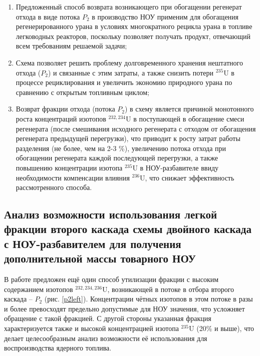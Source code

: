 \begin{enumerate}
    \item Предложенный способ возврата возникающего при обогащении регенерат отхода в виде потока $P_2$ в производство НОУ применим для обогащения регенерированного урана в условиях многократного рецикла урана в топливе легководных реакторов, поскольку позволяет получать продукт, отвечающий всем требованиям решаемой задачи;
    \item Схема позволяет решить проблему долговременного хранения нештатного отхода ($P_2$) и связанные с этим затраты, а также снизить потери $^{235}$U в процессе рециклирования и увеличить экономию природного урана по сравнению с открытым топливным циклом;
     \item Возврат фракции отхода (потока $P_2$) в схему является причиной монотонного роста концентраций изотопов $^{232,234}$U в поступающей в обогащение смеси регенерата (после смешивания исходного регенерата с отходом от обогащения регенерата предыдущей перегрузки), что приводит к росту затрат работы разделения (не более, чем на 2-3 \%), увеличению потока отхода при обогащении регенерата каждой последующей перегрузки, а также повышению концентрации изотопа $^{235}$U в НОУ-разбавителе ввиду необходимости компенсации влияния $^{236}$U, что снижает эффективность рассмотренного способа.
\end{enumerate}


\subsection{Анализ возможности использования легкой фракции второго каскада схемы двойного каскада с НОУ-разбавителем для получения дополнительной массы товарного НОУ}\label{indep_p2}

В работе предложен ещё один способ утилизации фракции с высоким содержанием изотопов $^{232,234,236}$U, возникающей в потоке в отбора второго каскада -- $P_2$ (рис. \ref{p2left}). Концентрации чётных изотопов в этом потоке в разы и более превосходят предельно допустимые для НОУ значения, что усложняет обращение с такой фракцией. С другой стороны указанная фракция характеризуется также и высокой концентрацией изотопа $^{235}$U (20\% и выше), что делает целесообразным анализ возможности её использования для воспроизводства ядерного топлива. 

